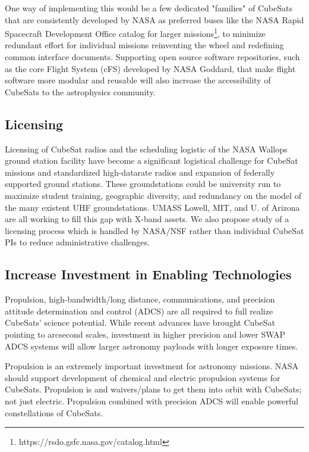 \documentclass[12pt]{article}
\begin{document}
One way of implementing this would be a few dedicated "families" of CubeSats that are consistently developed by NASA as preferred buses like the NASA Rapid Spacecraft Development Office catalog for larger missions\footnote{https://rsdo.gsfc.nasa.gov/catalog.html}, to minimize redundant effort for individual missions reinventing the wheel and redefining common interface documents. Supporting open source software repositories, such as the core Flight System (cFS) developed by NASA Goddard, that make flight software more modular and reusable will also increase the accessibility of CubeSats to the astrophysics community.%

\subsection{Licensing}
Licensing of CubeSat radios and the scheduling logistic of the NASA Wallops ground station facility have become a significant logistical challenge for CubeSat missions and standardized high-datarate radios and expansion of federally supported ground stations. These groundstations could be university run to  maximize student training, geographic diversity, and redundancy on the model of the many existent UHF groundstations. UMASS Lowell, MIT,  and U. of Arizona are all working to fill this gap with X-band assets. We also propose study of a licensing process which is handled by NASA/NSF rather than individual CubeSat PIs to reduce administrative challenges. 

\subsection{Increase Investment in Enabling Technologies}
Propulsion, high-bandwidth/long distance, communications, and precision attitude determination and control (ADCS) are all required to full realize CubeSats’ science potential. 
While recent advances have brought CubeSat pointing to arcsecond scales, investment in higher precision and lower SWAP ADCS systems will allow larger astronomy payloads with longer exposure times.

Propulsion is an extremely important investment for astronomy missions. NASA should support development of chemical and electric propulsion systems for CubeSats. Propulsion is  and waivers/plans to get them into orbit with CubeSats; not just electric.
Propulsion combined with precision ADCS will enable powerful constellations of CubeSats.
\end{document}

